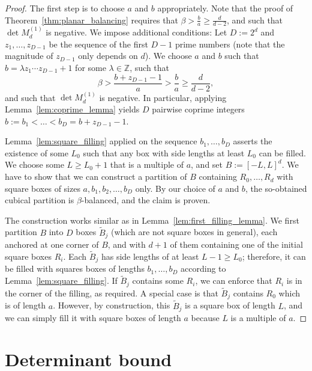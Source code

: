 \documentclass[12pt]{article}
\newcommand{\Z}{\mathbb{Z}}
\begin{document}
\begin{appendix}
\begin{proof}
The first step is to choose $a$ and $b$ appropriately. Note that the proof of 
Theorem~\ref{thm:planar_balancing} requires that $\beta>\frac{b}{a}\geq\frac{d}{d-2}$,
and such that $\det M^{(1)}_d$ is negative. 
We impose additional conditions:
Let $D:=2^d$ and $z_1,\ldots,z_{D-1}$ be the sequence of the first $D-1$ prime numbers
(note that the magnitude of $z_{D-1}$ only depends on $d$).
We choose $a$ and $b$ such that 
$b=\lambda z_1\cdots z_{D-1}+1$ for some $\lambda\in\Z$, such that
\[\beta>\frac{b+z_{D-1}-1}{a}>\frac{b}{a}\geq \frac{d}{d-2},\]
\noindent and such that $\det M^{(1)}_d$ is negative.
In particular, applying Lemma~\ref{lem:coprime_lemma} yields $D$ pairwise coprime integers
$b:=b_1<\ldots<b_D=b+z_{D-1}-1$.

Lemma~\ref{lem:square_filling} applied on the sequence $b_1,\ldots,b_D$ 
asserts the existence of some $L_0$ such that any box with side lengths at least $L_0$
can be filled. We choose some $L\geq L_0+1$ that is a multiple of $a$,
and set $B:=[-L,L]^d$. We have to show that we can construct a partition of $B$ 
containing $R_0,\ldots,R_d$
with square boxes of sizes $a,b_1,b_2,\ldots,b_D$ only. 
By our choice of $a$ and $b$, the so-obtained cubical
partition is $\beta$-balanced, and the claim is proven.

The construction works similar as
in Lemma~\ref{lem:first_filling_lemma}.
We first partition $B$
into $D$ boxes $\tilde{B}_j$ 
(which are not square boxes in general), each anchored at one corner of $B$,
and with $d+1$ of them containing one of the initial square boxes $R_i$.
Each $\tilde{B}_j$ has side lengths of at least $L-1\geq L_0$; therefore,
it can be filled with squares boxes of lengths $b_1,\ldots,b_D$ according to
Lemma~\ref{lem:square_filling}. If 
$\tilde{B}_j$ contains some $R_i$, we can enforce that $R_i$ is in the corner
of the filling, as required. A special case is that $\tilde{B}_j$
contains $R_0$ which is of length $a$. However, by construction,
this $\tilde{B}_j$ is a square box of length $L$, and we can simply fill
it with square boxes of length $a$ because $L$ is a multiple of $a$.
\end{proof}


\section{Determinant bound}
\label{app:determinant}


\end{appendix}
\end{document}

